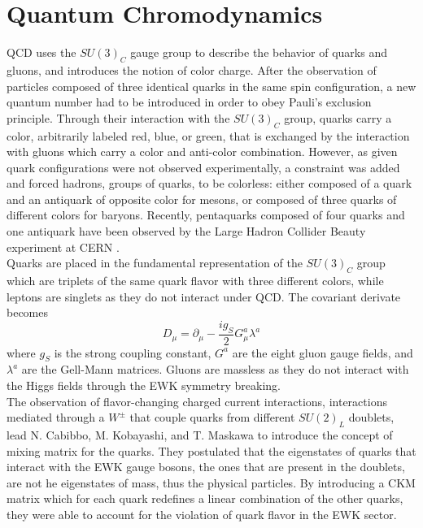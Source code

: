   \section{Quantum Chromodynamics}

    QCD uses the $ SU(3)_C $ gauge group to describe the behavior of quarks and gluons, and introduces the notion of color charge. After the observation of particles composed of three identical quarks in the same spin configuration, a new quantum number had to be introduced in order to obey Pauli's exclusion principle. Through their interaction with the $ SU(3)_C $ group, quarks carry a color, arbitrarily labeled red, blue, or green, that is exchanged by the interaction with gluons which carry a color and anti-color combination. However, as given quark configurations were not observed experimentally, a constraint was added and forced hadrons, groups of quarks, to be colorless: either composed of a quark and an antiquark of opposite color for mesons, or composed of three quarks of different colors for baryons. Recently, pentaquarks composed of four quarks and one antiquark have been observed by the Large Hadron Collider Beauty experiment at CERN \cite{Aaij:2015tga}. \\

    Quarks are placed in the fundamental representation of the $ SU(3)_C $ group which are triplets of the same quark flavor with three different colors, while leptons are singlets as they do not interact under QCD. The covariant derivate becomes
    \begin{equation}
      D_\mu = \partial_\mu - \frac{i g_S}{2} G^a_\mu \lambda^a
    \end{equation}
    where $ g_S $ is the strong coupling constant, $ G^a $ are the eight gluon gauge fields, and $ \lambda^a $ are the Gell-Mann matrices. Gluons are massless as they do not interact with the Higgs fields through the EWK symmetry breaking. \\

    The observation of flavor-changing charged current interactions, interactions mediated through a $ W^\pm $ that couple quarks from different $ SU(2)_L $ doublets, lead N. Cabibbo, M. Kobayashi, and T. Maskawa to introduce the concept of mixing matrix for the quarks. They postulated that the eigenstates of quarks that interact with the EWK gauge bosons, the ones that are present in the doublets, are not he eigenstates of mass, thus the physical particles. By introducing a CKM matrix which for each quark redefines a linear combination of the other quarks, they were able to account for the violation of quark flavor in the EWK sector.


